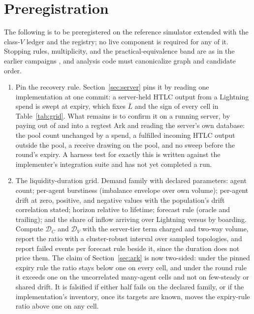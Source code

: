 \documentclass[11pt]{article}
\theoremstyle{plain}
\theoremstyle{definition}
\theoremstyle{remark}
\newcommand{\Dur}{\mathcal{D}}
\begin{document}


\section{Preregistration}
\label{sec:prereg}

The following is to be preregistered on the reference simulator extended with the class-$V$ ledger and the registry; no live component is required for any of it. Stopping rules, multiplicity, and the practical-equivalence band are as in the earlier campaigns \citep{spiral2026}, and analysis code must canonicalize graph and candidate order.

\begin{enumerate}[leftmargin=*,itemsep=2pt]
\item Pin the recovery rule. Section~\ref{sec:server} pins it by reading one implementation at one commit: a server-held HTLC output from a Lightning spend is swept at expiry, which fixes $\bar L$ and the sign of every cell in Table~\ref{tab:grid}. What remains is to confirm it on a running server, by paying out of and into a regtest Ark and reading the server's own database: the pool count unchanged by a spend, a fulfilled incoming HTLC output outside the pool, a receive drawing on the pool, and no sweep before the round's expiry. A harness test for exactly this is written against the implementer's integration suite and has not yet completed a run.
\item The liquidity-duration grid. Demand family with declared parameters: agent count; per-agent burstiness (imbalance envelope over own volume); per-agent drift at zero, positive, and negative values with the population's drift correlation stated; horizon relative to lifetime; forecast rule (oracle and trailing); and the share of inflow arriving over Lightning versus by boarding. Compute $\Dur_C$ and $\Dur_V$ with the server-tier term charged and two-way volume, report the ratio with a cluster-robust interval over sampled topologies, and report failed events per forecast rule beside it, since the duration does not price them. The claim of Section~\ref{sec:ark} is now two-sided: under the pinned expiry rule the ratio stays below one on every cell, and under the round rule it exceeds one on the uncorrelated many-agent cells and not on few-steady or shared drift. It is falsified if either half fails on the declared family, or if the implementation's inventory, once its targets are known, moves the expiry-rule ratio above one on any cell.

\end{enumerate}
\end{document}
